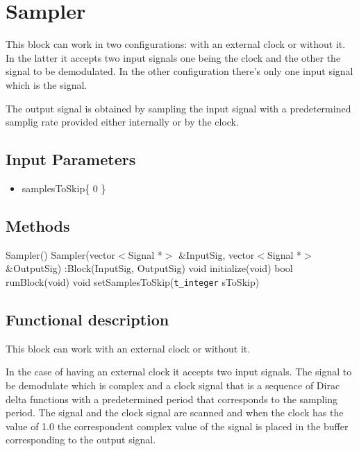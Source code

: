 \clearpage

\section{Sampler}

\maketitle

This block can work in two configurations: with an external clock or without it. In the latter it accepts two input signals one being the clock and the other the signal to be demodulated. In the other configuration there's only one input signal which is the signal. 

The output signal is obtained by sampling the input signal with a predetermined samplig rate provided either internally or by the clock.

\subsection*{Input Parameters}

\begin{itemize}
	\item samplesToSkip\{ 0 \}
\end{itemize}

\subsection*{Methods}
 
Sampler() {}
\bigbreak
Sampler(vector$<$Signal *$>$ \&InputSig, vector$<$Signal *$>$ \&OutputSig) :Block(InputSig, OutputSig) {}
\bigbreak
void initialize(void)
\bigbreak
bool runBlock(void)
\bigbreak
void setSamplesToSkip(\texttt{t\_integer} sToSkip)

\subsection*{Functional description}

This block can work with an external clock or without it. 

In the case of having an external clock it accepts two input signals. The signal to be demodulate which is complex and a clock signal that is a sequence of Dirac delta functions with a predetermined period that corresponds to the sampling period. The signal and the clock signal are scanned and when the clock has the value of 1.0 the correspondent complex value of the signal is placed in the buffer corresponding to the output signal.

